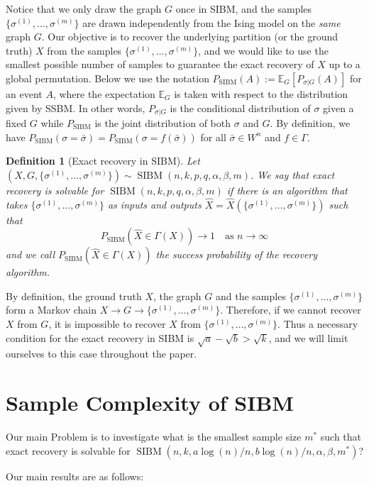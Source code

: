 \label{key}\documentclass[conference]{IEEEtran}
\newtheorem{definition}{Definition}%
\DeclareMathOperator{\SIBM}{SIBM}
\begin{document}
Notice that we only draw the graph $G$ once in SIBM, and the samples $\{\sigma^{(1)},\dots,\sigma^{(m)}\}$ are drawn independently from the Ising model on the {\em same} graph $G$.
Our objective is to recover the underlying partition (or the ground truth) $X$ from the samples $\{\sigma^{(1)},\dots,\sigma^{(m)}\}$, and we would like to use the smallest possible number of samples to guarantee the exact recovery of $X$ up to a global permutation.
Below we use the notation $P_{\SIBM}(A):=\mathbb{E}_G[P_{\sigma|G}(A)]$ for an event $A$, where the expectation $\mathbb{E}_G$ is taken with respect to the distribution given by SSBM. In other words, $P_{\sigma|G}$ is the conditional distribution of  $\sigma$ given a fixed $G$ while $P_{\SIBM}$ is the joint distribution of both $\sigma$ and $G$.
By definition, we have $P_{\SIBM}(\sigma=\bar{\sigma})=P_{\SIBM}(\sigma=f(\bar{\sigma}))$ for all $\bar{\sigma}\in W^n$ and $f\in \Gamma$.


\begin{definition}[Exact recovery in SIBM]
Let $(X,G,\{\sigma^{(1)},\dots,\sigma^{(m)}\}) \sim \SIBM(n,k,p,q,\alpha,\beta,m)$.
We say that exact recovery is solvable for $\SIBM(n,k,p,q,\alpha,\beta,m)$ if there is an algorithm that takes $\{\sigma^{(1)},\dots,\sigma^{(m)}\}$ as inputs and outputs $\hat{X}=\hat{X}(\{\sigma^{(1)},\dots,\sigma^{(m)}\})$ such that
$$
P_{\SIBM}(\hat{X} \in \Gamma(X)) \to 1
\text{~~~as~} n\to\infty
$$
and we call $P_{\SIBM}(\hat{X} \in \Gamma(X))$ the success probability of the recovery algorithm.
\end{definition}

By definition, the ground truth $X$, the graph $G$ and the samples $\{\sigma^{(1)},\dots,\sigma^{(m)}\}$ form a Markov chain $X\to G\to \{\sigma^{(1)},\dots,\sigma^{(m)}\}$. Therefore, if we cannot recover $X$ from $G$, it is impossible to recover $X$ from $\{\sigma^{(1)},\dots,\sigma^{(m)}\}$. Thus a necessary condition for the exact recovery in SIBM is $\sqrt{a}-\sqrt{b}> \sqrt{k}$, and we will limit ourselves to this case throughout the paper.

\section{Sample Complexity of SIBM}\label{s:trans}
Our main Problem is to investigate what is the smallest sample size $m^\ast$ such that exact recovery is solvable for $\SIBM(n,k, a\log(n)/n, b\log(n)/n,\alpha,\beta,m^\ast)$?

Our main results are as follows:
\end{document}
